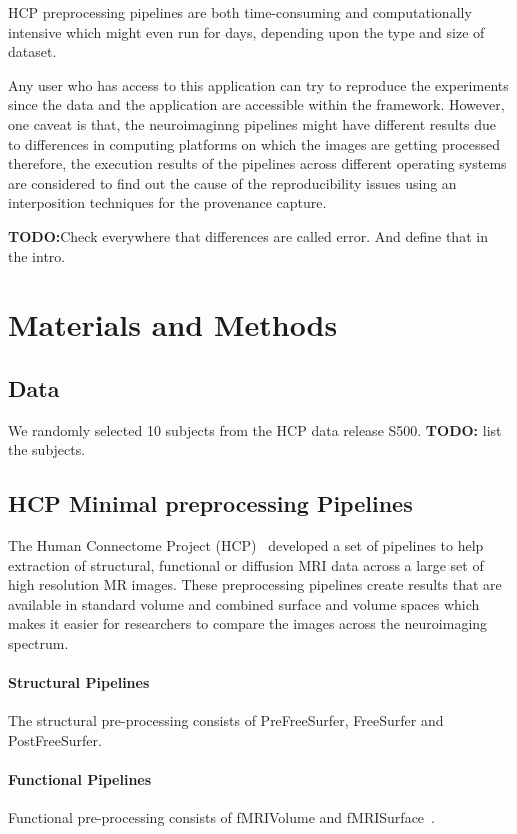 \documentclass{article}
\newcommand{\todo}[1]{\color{red}\textbf{TODO:}#1\color{black}}
\begin{document}
HCP preprocessing pipelines are both time-consuming and
computationally intensive which might even run for days, depending
upon the type and size of dataset.

Any
user who has access to this application can try to reproduce the
experiments since the data and the application are accessible within
the framework. However, one caveat is that, the neuroimaginng
pipelines might have different results due to differences in computing
platforms on which the images are getting processed
~\cite{10.3389/conf.fninf.2014.18.00076} therefore, the execution
results of the pipelines across different operating systems are
considered to find out the cause of the reproducibility issues using
an interposition techniques for the provenance capture.

\todo{Check everywhere that differences are called error. And define that in the intro.}


\section{Materials and Methods}

\subsection{Data}

We randomly selected 10 subjects from the HCP data release
S500. \todo{ list the subjects.}

\subsection{HCP Minimal preprocessing Pipelines}

The Human Connectome Project (HCP)~\cite{Gla13} developed a set of
pipelines to help extraction of structural, functional or diffusion
MRI data across a large set of high resolution MR images. These
preprocessing pipelines create results that are available in standard
volume and combined surface and volume spaces which makes it easier
for researchers to compare the images across the neuroimaging
spectrum.

\paragraph{Structural Pipelines} The structural pre-processing consists of PreFreeSurfer, FreeSurfer and PostFreeSurfer. 
\paragraph{Functional Pipelines} Functional pre-processing consists of fMRIVolume and fMRISurface~\cite{FSL}. 
\end{document}

